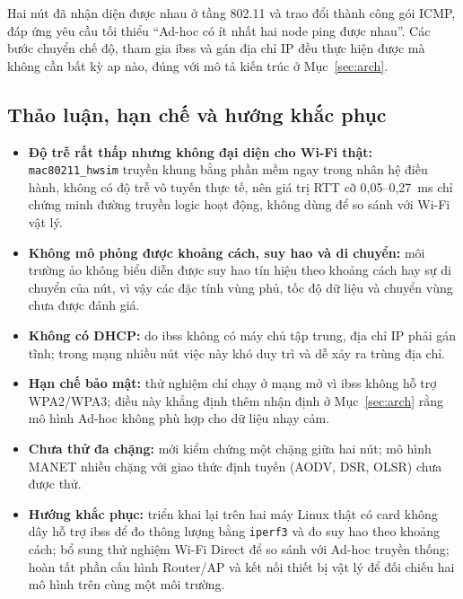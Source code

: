 Hai nút đã nhận diện được nhau ở tầng 802.11 và trao đổi thành công gói ICMP,
đáp ứng yêu cầu tối thiểu ``Ad-hoc có ít nhất hai node ping được nhau''. Các
bước chuyển chế độ, tham gia \ac{ibss} và gán địa chỉ IP đều thực hiện được mà
không cần bất kỳ \ac{ap} nào, đúng với mô tả kiến trúc ở
Mục~\ref{sec:arch}.

\subsection{Thảo luận, hạn chế và hướng khắc phục}
\begin{itemize}[leftmargin=*]
  \item \textbf{Độ trễ rất thấp nhưng không đại diện cho Wi-Fi thật:}
    \texttt{mac80211\_hwsim} truyền khung bằng phần mềm ngay trong nhân hệ điều
    hành, không có độ trễ vô tuyến thực tế, nên giá trị RTT cỡ 0,05--0,27~ms chỉ
    chứng minh đường truyền logic hoạt động, không dùng để so sánh với Wi-Fi vật
    lý.
  \item \textbf{Không mô phỏng được khoảng cách, suy hao và di chuyển:} môi
    trường ảo không biểu diễn được suy hao tín hiệu theo khoảng cách hay sự di
    chuyển của nút, vì vậy các đặc tính vùng phủ, tốc độ dữ liệu và chuyển vùng
    chưa được đánh giá.
  \item \textbf{Không có DHCP:} do \ac{ibss} không có máy chủ tập trung, địa chỉ
    IP phải gán tĩnh; trong mạng nhiều nút việc này khó duy trì và dễ xảy ra
    trùng địa chỉ.
  \item \textbf{Hạn chế bảo mật:} thử nghiệm chỉ chạy ở mạng mở vì \ac{ibss}
    không hỗ trợ WPA2/WPA3; điều này khẳng định thêm nhận định ở
    Mục~\ref{sec:arch} rằng mô hình Ad-hoc không phù hợp cho dữ liệu nhạy cảm.
  \item \textbf{Chưa thử đa chặng:} mới kiểm chứng một chặng giữa hai nút; mô
    hình MANET nhiều chặng với giao thức định tuyến (AODV, DSR, OLSR) chưa được
    thử.
  \item \textbf{Hướng khắc phục:} triển khai lại trên hai máy Linux thật có card
    không dây hỗ trợ \ac{ibss} để đo thông lượng bằng \texttt{iperf3} và đo suy
    hao theo khoảng cách; bổ sung thử nghiệm Wi-Fi Direct để so sánh với Ad-hoc
    truyền thống; hoàn tất phần cấu hình Router/AP và kết nối thiết bị vật lý để
    đối chiếu hai mô hình trên cùng một môi trường.
\end{itemize}

\endgroup

